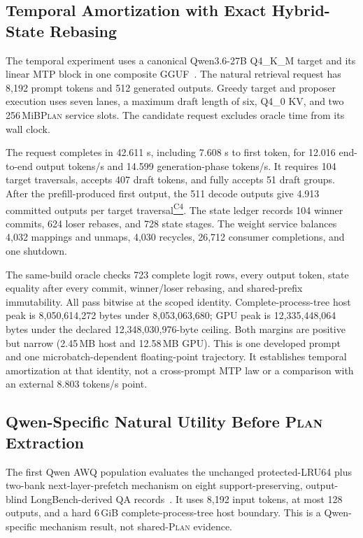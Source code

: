 \documentclass[letterpaper,twocolumn,10pt]{article}
\newcommand{\Plan}{\textsc{Plan}\xspace}
\newcommand{\GiB}{\,GiB\xspace}
\newcommand{\MiB}{\,MiB\xspace}
\newcommand{\claimref}[1]{\hyperlink{claim:#1}{\textsuperscript{\textsf{#1}}}}
\begin{document}
{\subsection{Temporal Amortization with Exact Hybrid-State Rebasing}
\label{sec:mtp}

The temporal experiment uses a canonical Qwen3.6-27B Q4\_K\_M target and its
linear MTP block in one composite GGUF~\cite{qwen3report}.  The natural
retrieval request has 8,192 prompt tokens and 512 generated outputs.  Greedy
target and proposer execution uses seven lanes, a maximum draft length of six,
Q4\_0 KV, and two 256\MiB \Plan service slots.  The candidate request excludes
oracle time from its wall clock.

The request completes in 42.611 s, including 7.608 s to first token, for 12.016
end-to-end output tokens/s and 14.599 generation-phase tokens/s.  It requires
104 target traversals, accepts 407 draft tokens, and fully accepts 51 draft
groups.  After the prefill-produced first output, the 511 decode outputs give
4.913 committed outputs per target traversal\claimref{C4}.  The
state ledger records 104 winner commits, 624 loser rebases, and 728 state
stages.  The weight service balances 4,032 mappings and unmaps, 4,030 recycles,
26,712 consumer completions, and one shutdown.

The same-build oracle checks 723 complete logit rows, every output token, state
equality after every commit, winner/loser rebasing, and shared-prefix
immutability.  All pass bitwise at the scoped identity.  Complete-process-tree
host peak is
8,050,614,272 bytes under 8,053,063,680; GPU peak is 12,335,448,064 bytes under
the declared 12,348,030,976-byte ceiling.  Both margins are positive but narrow
(2.45\,MB host and 12.58\,MB GPU).  This is one developed prompt and one
microbatch-dependent floating-point trajectory.  It establishes temporal
amortization at that identity, not a cross-prompt MTP law or a comparison with
an external 8.803 tokens/s point.

\subsection{Qwen-Specific Natural Utility Before \Plan Extraction}
\label{sec:qwennatural}

The first Qwen AWQ population evaluates the unchanged protected-LRU64 plus
two-bank next-layer-prefetch mechanism on eight support-preserving,
output-blind LongBench-derived QA records~\cite{longbench}.  It uses 8,192 input
tokens, at most 128 outputs, and a hard 6\GiB complete-process-tree host
boundary.  This is a
Qwen-specific mechanism result, not shared-\Plan evidence.

}
\end{document}
